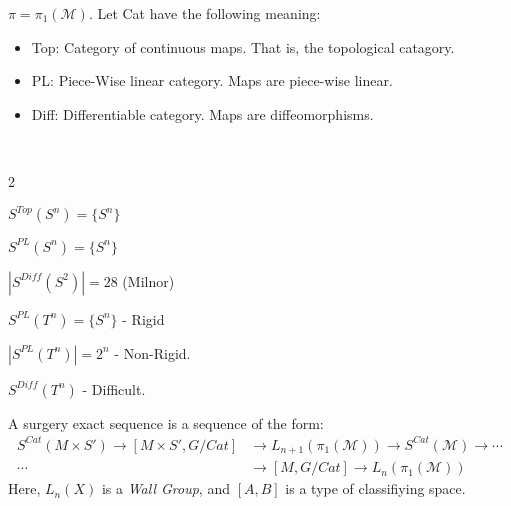 \documentclass[crop=false,class=book,oneside]{standalone}                      %
\begin{document}
                $\pi=\pi_{1}(\mathcal{M})$.
                Let Cat have the following meaning:
                \begin{itemize}
                    \item Top: Category of continuous maps.
                          That is, the topological catagory.
                    \item PL: Piece-Wise linear category.
                          Maps are piece-wise linear.
                    \item Diff: Differentiable category.
                          Maps are diffeomorphisms.
                \end{itemize}
                \begin{example}
                    \
                    \begin{enumerate}
                    \end{enumerate}
                \end{example}
                A surgery exact sequence is a sequence of the form:
                \begin{align*}
                    S^{Cat}(M\times S')\rightarrow[M\times S',G/Cat]
                    &\rightarrow L_{n+1}(\pi_{1}(\mathcal{M}))
                    \rightarrow{S^{Cat}}(\mathcal{M})
                    \rightarrow\cdots\\
                    \cdots
                    &\rightarrow{[M,G/Cat]}
                    \rightarrow{L_{n}}(\pi_{1}(\mathcal{M}))
                \end{align*}
                Here, $L_{n}(X)$ is a \textit{Wall Group},
                and $[A,B]$ is a type of classifiying space.
\end{document}
